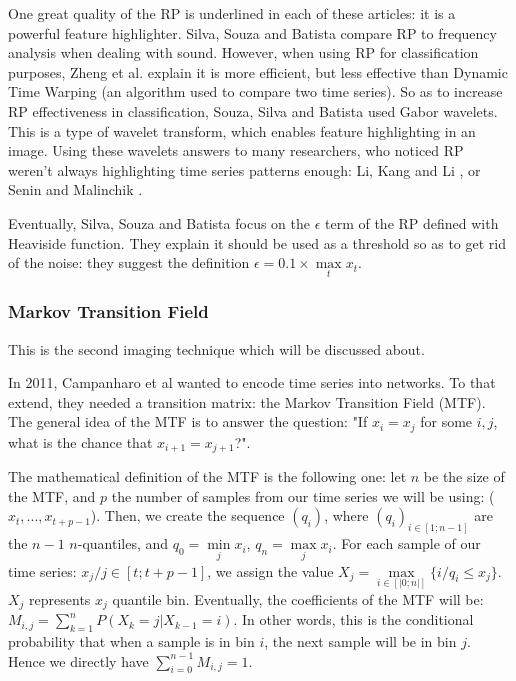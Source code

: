 \documentclass[11pt]{article}
\begin{document}
\begin{onehalfspace}
One great quality of the RP is underlined in each of these articles: it is a powerful feature highlighter. Silva, Souza and Batista \cite{silva} compare RP to frequency analysis when dealing with sound. However, when using RP for classification purposes, Zheng et al. \cite{zheng} explain it is more efficient, but less effective than Dynamic Time Warping (an algorithm used to compare two time series). So as to increase RP effectiveness in classification, Souza, Silva and Batista \cite{souza} used Gabor wavelets. This is a type of wavelet transform, which enables feature highlighting in an image. Using these wavelets answers to many researchers, who noticed RP weren't always highlighting time series patterns enough: Li, Kang and Li \cite{li}, or Senin and Malinchik \cite{senin}. 

Eventually, Silva, Souza and Batista \cite{silva} focus on the $\epsilon$ term of the RP defined with Heaviside function. They explain it should be used as a threshold so as to get rid of the noise: they suggest the definition $\epsilon = 0.1 \times \max\limits_t x_t$.

\subsubsection{Markov Transition Field}

This is the second imaging technique which will be discussed about. 

In 2011, Campanharo et al \cite{campanharo} wanted to encode time series into networks. To that extend, they needed a transition matrix: the Markov Transition Field (MTF). The general idea of the MTF is to answer the question: "If $x_i = x_j$ for some $i,j$, what is the chance that $x_{i+1} = x_{j+1}$?". 

The mathematical definition of the MTF is the following one: let $n$ be the size of the MTF, and $p$ the number of samples from our time series we will be using: ($x_t,...,x_{t+p-1}$). Then, we create the sequence $(q_i)$, where $(q_i)_{i \in [1;n-1]}$ are the $n-1$ $n$-quantiles, and $q_0 = \min\limits_j x_i$, $q_n = \max\limits_j x_i$. For each sample of our time series: $x_j / j \in [t;t+p-1]$, we assign the value $X_j = \max\limits_{i \in [|0;n|]} \{ i / q_i \leq x_j\}$. $X_j$ represents $x_j$ quantile bin. Eventually, the coefficients of the MTF will be: $M_{i,j} = \sum\limits_{k=1}^{n} P(X_k = j | X_{k-1} = i)$. In other words, this is the conditional probability that when a sample is in bin $i$, the next sample will be in bin $j$. Hence we directly have $\sum\limits_{i=0}^{n-1} M_{i,j} = 1$. 


\end{onehalfspace}
\end{document}
